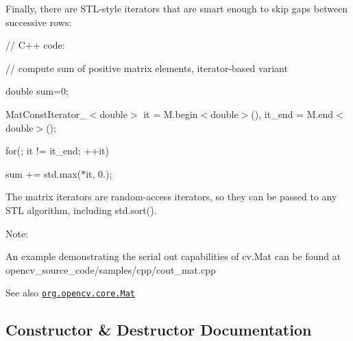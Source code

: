 Finally, there are S\+T\+L-\/style iterators that are smart enough to skip gaps between successive rows\+: {\ttfamily }

{\ttfamily }

{\ttfamily }

{\ttfamily // C++ code\+:}

{\ttfamily }

{\ttfamily }

{\ttfamily // compute sum of positive matrix elements, iterator-\/based variant}

{\ttfamily }

{\ttfamily }

{\ttfamily double sum=0;}

{\ttfamily }

{\ttfamily }

{\ttfamily Mat\+Const\+Iterator\+\_\+$<$double$>$ it = M.\+begin$<$double$>$(), it\+\_\+end = M.\+end$<$double$>$();}

{\ttfamily }

{\ttfamily }

{\ttfamily for(; it != it\+\_\+end; ++it)}

{\ttfamily }

{\ttfamily }

{\ttfamily sum += std.\+max($\ast$it, 0.);}

{\ttfamily }

{\ttfamily }

{\ttfamily The matrix iterators are random-\/access iterators, so they can be passed to any S\+TL algorithm, including {\ttfamily std.\+sort()}. }

Note\+:


\begin{DoxyItemize}
\item An example demonstrating the serial out capabilities of cv.\+Mat can be found at opencv\+\_\+source\+\_\+code/samples/cpp/cout\+\_\+mat.\+cpp 
\end{DoxyItemize}

\begin{DoxySeeAlso}{See also}
\href{http://docs.opencv.org/modules/core/doc/basic_structures.html#mat}{\tt org.\+opencv.\+core.\+Mat} 
\end{DoxySeeAlso}


\subsection{Constructor \& Destructor Documentation}
\mbox{\label{classorg_1_1opencv_1_1core_1_1_mat_ad81cccc01050e0cbc98d40488bd287c4}} 
